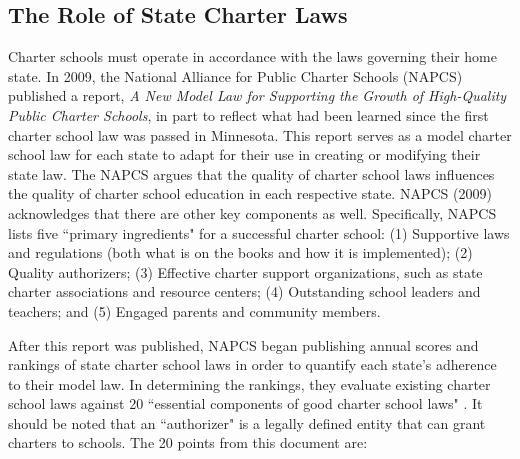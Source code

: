 \documentclass[letterpaper,12p,twoside]{article} %
\begin{document}
\subsection{The Role of State Charter Laws}

Charter schools must operate in accordance with the laws governing their home state. In 2009, the National Alliance for Public Charter Schools (NAPCS) published a report, \textit{A New Model Law for Supporting the Growth of High-Quality Public Charter Schools}, in part to reflect what had been learned since the first charter school law was passed in Minnesota. This report serves as a model charter school law for each state to adapt for their use in creating or modifying their state law. The NAPCS argues that the quality of charter school laws influences the quality of charter school education in each respective state. NAPCS (2009) acknowledges that there are other key components as well. Specifically, NAPCS lists five ``primary ingredients" \cite[p. 1]{NAPCS2009} for a successful charter school: (1) Supportive laws and regulations (both what is on the books and how it is implemented); (2) Quality authorizers; (3) Effective charter support organizations, such as state charter associations and resource centers; (4) Outstanding school leaders and teachers; and (5) Engaged parents and community members.

After this report was published, NAPCS began publishing annual scores and rankings of state charter school laws in order to quantify each state's adherence to their model law. In determining the rankings, they evaluate existing charter school laws against 20 ``essential components of good charter school laws" \cite[pp. 6--7]{NAPCS2012}. It should be noted that an ``authorizer" is a legally defined entity that can grant charters to schools. The 20 points from this document are:
\end{document}
